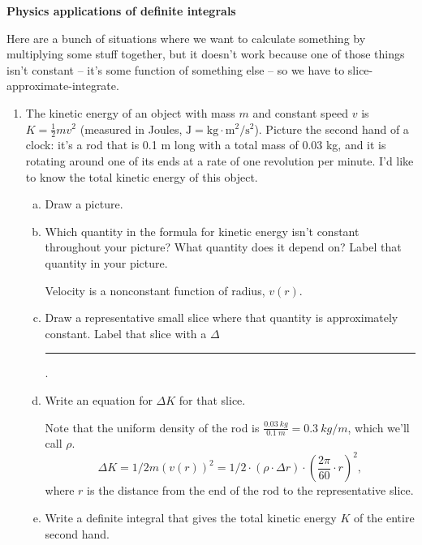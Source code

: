\documentclass[12pt]{article}
\newenvironment{red}{\color{red}}{\ignorespacesafterend}
\renewcommand{\section}[1]{\begin{center} \textbf{#1} \\\end{center}}
\begin{document}
%


\allowdisplaybreaks
\section{Physics applications of definite integrals}
Here are a bunch of situations where we want to calculate something by multiplying some stuff together, but it doesn't work because one of those things isn't constant -- it's some function of something else -- so we have to slice-approximate-integrate.

\hrulefill

\begin{enumerate}
\item The kinetic energy of an object with mass \(m\) and constant speed \(v\) is \(K = \frac{1}{2} mv^2\) (measured in Joules, \(\unit{\J} = \unit{\kg \cdot \m^2 / \s ^2} \)). Picture the second hand of a clock: it's a rod that is 0.1 m long with a total mass of 0.03 kg, and it is rotating around one of its ends at a rate of one revolution per minute. I'd like to know the total kinetic energy of this object.
\begin{enumerate}[(a)]
\item Draw a picture.
\item Which quantity in the formula for kinetic energy isn't constant throughout your picture? What quantity does it depend on? Label that quantity in your picture.

\begin{red}
Velocity is a nonconstant function of radius, $v(r)$. 
\end{red}
\item Draw a representative small slice where that quantity is approximately constant. Label that slice with a \(\Delta\)\rule{0.5cm}{0.15mm}.
\item Write an equation for \(\Delta K\) for that slice.

\begin{red}
    Note that the uniform density of the rod is $\frac{\SI{0.03}{kg}}{\SI{0.1}{m}} = \SI{0.3}{kg/m}$, which we'll call $\rho$.
    \[\Delta K = 1/2m(v(r))^2 = 1/2\cdot (\rho\cdot\Delta r)\cdot\left(\frac{2\pi}{60}\cdot r\right)^2, \]
where $r$ is the distance from the end of the rod to the representative slice.
\end{red}
\item Write a definite integral that gives the total kinetic energy \(K\) of the entire second hand.


\end{enumerate}
\end{enumerate}
\end{document}
